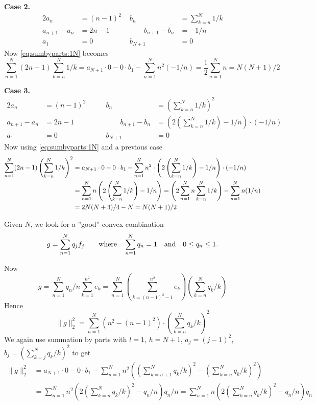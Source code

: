 \documentclass{article}
\begin{document}
\textbf{Case 2.}
\begin{alignat*}{2}
a_n &= (n-1)^2      &           b_n &= \sum_{k=n}^N 1/k \\
a_{n+1} - a_n &= 2n-1 \qquad &  \qquad b_{n+1} - b_n &= -1/n \\
a_1 &= 0              &               b_{N+1} &= 0
\end{alignat*}
Now \eqref{eq:sumbyparts:1N} becomes
\begin{equation}
\sum_{n=1}^N (2n-1) \sum_{k=n}^N 1/k
= a_{N+1}\cdot 0 - 0 \cdot b_1 - \sum_{n=1}^N n^2(-1/n)
= \frac{1}{2} \sum_{n=1}^N n 
= N(N+1)/2
\end{equation}


\textbf{Case 3.}
\begin{alignat*}{2}
a_n &= (n-1)^2  \qquad &           b_n &= \left(\sum_{k=n}^N 1/k\right)^2 \\
a_{n+1} - a_n &= 2n-1 \qquad & \qquad
  b_{n+1} - b_n &= 
    \left(2\left(\sum_{k=n}^N 1/k\right) - 1/n\right)\cdot(-1/n) \\
a_1 &= 0           &               b_{N+1} &= 0
\end{alignat*}
Now using  \eqref{eq:sumbyparts:1N} and a previous case
\begin{align}
\sum_{n=1}^N (2n-1) \left(\sum_{k=n}^N 1/k\right)^2
&= a_{N+1}\cdot 0 - 0 \cdot b_1 
   - \sum_{n=1}^N n^2
     \cdot
     \left(2\left(\sum_{k=n}^N 1/k\right) - 1/n\right)\cdot(-1/n) \notag \\
&= \sum_{n=1}^N n \left(2\left(\sum_{k=n}^N 1/k\right) - 1/n\right) 
 = \left(2\sum_{n=1}^N n \sum_{k=n}^N 1/k\right)
    - \sum_{n=1}^N n(1/n) \notag \\
&= 2N(N+3)/4 - N
 = N(N+1)/2
\end{align}


Given $N$,  we look for a ''good'' convex combination 
\begin{equation*}
g = \sum_{n=1}^N q_jf_j \qquad  
\textnormal{where}\quad
\sum_{n=1}^N q_n = 1\quad  \textnormal{and}\quad 0 \leq q_n \leq 1.
\end{equation*}

\iffalse
Now
\begin{equation*}
g 
= \sum_{n=1}^N q_n/n \sum_{k=1}^{n^2} e_k
= \sum_{n=1}^N 
    \left(\sum_{k=(n-1)^2-1}^{n^2} e_k\right)
    \left(\sum_{k=n}^N q_k/k \right)
\end{equation*}
Hence
\begin{equation*}
\|g\|_2^2 
= \sum_{n=1}^N 
  \left(n^2 - (n-1)^2\right) \cdot  \left(\sum_{k=n}^N q_k/k \right)^2
\end{equation*}
We again use summation by parts with 
\(l=1\),
\(h=N+1\),
\(a_j = (j-1)^2\),
\(b_j = \left(\sum_{k=j}^N q_k/k\right)^2\)
to get
\begin{align*}
\|g\|_2^2 
&= a_{N+1}\cdot 0 - 0 \cdot b_1 
  - \sum_{n=1}^N n^2 
    \left( 
       \left(\sum_{k=n+1}^N q_k/k\right)^2
       -
       \left(\sum_{k=n}^N q_k/k\right)^2
    \right)
  \\
&= \sum_{n=1}^N n^2 \left(2\left(\sum_{k=n}^N q_k/k\right)^2 - q_n/n\right)q_n/n
 = \sum_{n=1}^N n \left(2\left(\sum_{k=n}^N q_k/k\right)^2 - q_n/n\right)q_n
\end{align*}
\end{document}
